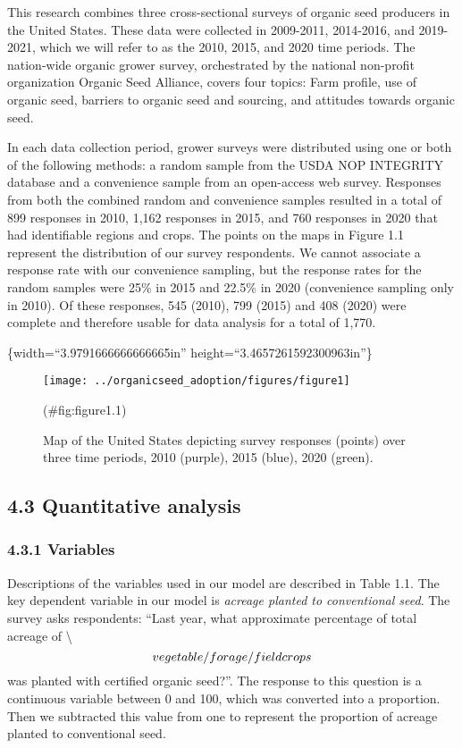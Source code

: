 \documentclass[twoside,12pt,final]{ucthesis-CA2012}
\begin{document}
\begin{ucmainmatter}
This research combines three cross-sectional surveys of organic seed
producers in the United States. These data were collected in 2009-2011,
2014-2016, and 2019-2021, which we will refer to as the 2010, 2015, and
2020 time periods. The nation-wide organic grower survey, orchestrated
by the national non-profit organization Organic Seed Alliance, covers
four topics: Farm profile, use of organic seed, barriers to organic seed
and sourcing, and attitudes towards organic seed.

In each data collection period, grower surveys were distributed using
one or both of the following methods: a random sample from the USDA NOP
INTEGRITY database and a convenience sample from an open-access web
survey. Responses from both the combined random and convenience samples
resulted in a total of 899 responses in 2010, 1,162 responses in 2015,
and 760 responses in 2020 that had identifiable regions and crops. The
points on the maps in Figure 1.1 represent the distribution of our
survey respondents. We cannot associate a response rate with our
convenience sampling, but the response rates for the random samples were
25\% in 2015 and 22.5\% in 2020 (convenience sampling only in 2010). Of
these responses, 545 (2010), 799 (2015) and 408 (2020) were complete and
therefore usable for data analysis for a total of 1,770.

\{width=``3.9791666666666665in''
height=``3.4657261592300963in''\}
\begin{figure}

{\centering \texttt{[image: ../organicseed\_adoption/figures/figure1]} 

}

\caption{Map of the United States depicting survey responses (points) over three time periods, 2010 (purple), 2015 (blue), 2020 (green).}(\#fig:figure1.1)
\end{figure}
\hypertarget{quantitative-analysis}{%
\subsection{4.3 Quantitative analysis}\label{quantitative-analysis}}

\hypertarget{variables}{%
\subsubsection{4.3.1 Variables}\label{variables}}

Descriptions of the variables used in our model are described in Table
1.1. The key dependent variable in our model is \emph{acreage planted to
conventional seed}. The survey asks respondents: ``Last year, what
approximate percentage of total acreage of \textbackslash{}\[vegetable/forage/field
crops\\\] was planted with certified organic seed?''. The response to
this question is a continuous variable between 0 and 100, which was
converted into a proportion. Then we subtracted this value from one to
represent the proportion of acreage planted to conventional seed.


\end{ucmainmatter}
\end{document}
